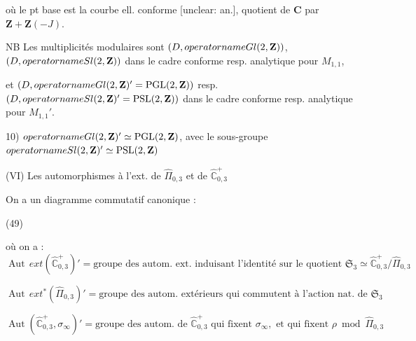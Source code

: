 où le pt base est la courbe ell. conforme [unclear: an.], quotient de $\mathbf{C}$ par $\mathbf{Z} + \mathbf{Z}(-J)$.

NB Les multiplicités modulaires sont $(D, \\operatorname{Gl}(2, \mathbf{Z}))$, $(D, \\operatorname{Sl}(2, \mathbf{Z}))$ dans le cadre conforme resp. analytique pour $M_{1,1}$,

et $(D, \\operatorname{Gl}(2, \mathbf{Z})' = \operatorname{PGL}(2, \mathbf{Z}))$ resp. $(D, \\operatorname{Sl}(2, \mathbf{Z})' = \operatorname{PSL}(2, \mathbf{Z}))$ dans le cadre conforme resp. analytique pour $M_{1,1}'$.

10) $\\operatorname{Gl}(2, \mathbf{Z})' \simeq \operatorname{PGL}(2, \mathbf{Z})$, avec le sous-groupe $\\operatorname{Sl}(2, \mathbf{Z})' \simeq \operatorname{PSL}(2, \mathbf{Z})$

\newpage


(VI) Les automorphismes à l'ext. de $\widehat{\Pi}_{0,3}$ et de $\widehat{\mathbb{C}}_{0,3}^+$

On a un diagramme commutatif canonique :

(49)

où on a :
$\operatorname{Aut}\,ext(\widehat{\mathbb{C}}_{0,3}^+)' = \text{groupe des autom. ext. induisant l'identité sur le quotient } \mathfrak{S}_3 \simeq \widehat{\mathbb{C}}_{0,3}^+/\widehat{\Pi}_{0,3}$

$\operatorname{Aut}\,ext^*(\widehat{\Pi}_{0,3})' = \text{groupe des autom. extérieurs qui commutent à l'action nat. de } \mathfrak{S}_3$

$\operatorname{Aut}(\widehat{\mathbb{C}}_{0,3}^+, \sigma_\infty)' = \text{groupe des autom. de } \widehat{\mathbb{C}}_{0,3}^+ \text{ qui fixent } \sigma_\infty, \text{ et qui fixent } \rho \bmod \widehat{\Pi}_{0,3}$

